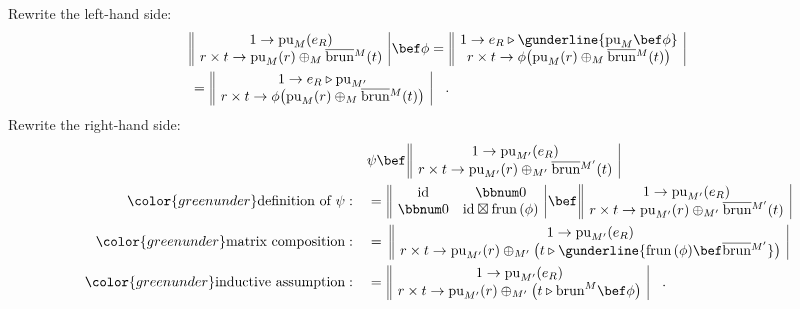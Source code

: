 Rewrite the left-hand side:
\begin{align*}
 & \begin{array}{||c|}
1\rightarrow\text{pu}_{M}(e_{R})\\
r\times t\rightarrow\text{pu}_{M}(r)\oplus_{M}\overline{\text{brun}}{}^{M}(t)
\end{array}\,\bef\phi=\,\begin{array}{||c|}
1\rightarrow e_{R}\triangleright\gunderline{\text{pu}_{M}\bef\phi}\\
r\times t\rightarrow\phi\big(\text{pu}_{M}(r)\oplus_{M}\overline{\text{brun}}{}^{M}(t)\big)
\end{array}\\
 & =\,\begin{array}{||c|}
1\rightarrow e_{R}\triangleright\text{pu}_{M^{\prime}}\\
r\times t\rightarrow\phi\big(\text{pu}_{M}(r)\oplus_{M}\overline{\text{brun}}{}^{M}(t)\big)
\end{array}\quad.
\end{align*}
Rewrite the right-hand side:
\begin{align*}
 & \psi\bef\,\begin{array}{||c|}
1\rightarrow\text{pu}_{M^{\prime}}(e_{R})\\
r\times t\rightarrow\text{pu}_{M^{\prime}}(r)\oplus_{M^{\prime}}\overline{\text{brun}}{}^{M^{\prime}}(t)
\end{array}\\
{\color{greenunder}\text{definition of }\psi:}\quad & =\,\begin{array}{||cc|}
\text{id} & \bbnum 0\\
\bbnum 0 & \text{id}\boxtimes\text{frun}\,(\phi)
\end{array}\,\bef\,\begin{array}{||c|}
1\rightarrow\text{pu}_{M^{\prime}}(e_{R})\\
r\times t\rightarrow\text{pu}_{M^{\prime}}(r)\oplus_{M^{\prime}}\overline{\text{brun}}{}^{M^{\prime}}(t)
\end{array}\\
{\color{greenunder}\text{matrix composition}:}\quad & =\,\,\begin{array}{||c|}
1\rightarrow\text{pu}_{M^{\prime}}(e_{R})\\
r\times t\rightarrow\text{pu}_{M^{\prime}}(r)\oplus_{M^{\prime}}\big(t\triangleright\gunderline{\text{frun}\,(\phi)\bef\overline{\text{brun}}{}^{M^{\prime}}}\big)
\end{array}\\
{\color{greenunder}\text{inductive assumption}:}\quad & =\,\begin{array}{||c|}
1\rightarrow\text{pu}_{M^{\prime}}(e_{R})\\
r\times t\rightarrow\text{pu}_{M^{\prime}}(r)\oplus_{M^{\prime}}\big(t\triangleright\text{brun}^{M}\bef\phi\big)
\end{array}\quad.
\end{align*}

